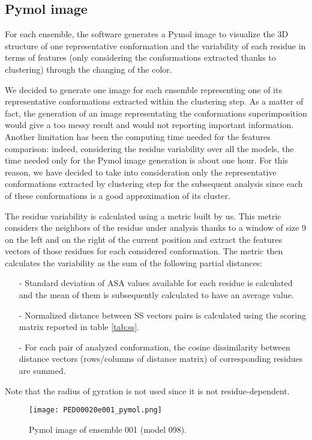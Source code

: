 \subsection{Pymol image}
For each ensemble, the software generates a Pymol image to visualize the 3D structure of one representative conformation and the variability of each residue in terms of features (only considering the conformations extracted thanks to clustering) through the changing of the color. %

We decided to generate one image for each ensemble representing one of its representative conformations extracted within the clustering step.
As a matter of fact, the generation of an image representating the conformations superimposition would give a too messy result and would not reporting important information. 
Another limitation has been the computing time needed for the features comparison: indeed, considering the residue variability over all the models, the time needed only for the Pymol image generation is about one hour. For this reason, we have decided to take into consideration only the representative conformations extracted by clustering step for the subsequent analysis since each of these conformations is a good approximation of its cluster.

\medskip
The residue variability is calculated using a metric built by us. 
This metric considers the neighbors of the residue under analysis thanks to a window of size 9 on the left and on the right of the current position and extract the features vectors of those residues for each considered conformation. 
The metric then calculates the variability as the sum of the following partial distances:
\begin{itemize}
\item[-] Standard deviation of ASA values available for each residue is calculated and the mean of them is subsequently calculated to have an average value.
\item[-] Normalized distance between SS vectors pairs is calculated using the scoring matrix reported in table \ref{tab:ss}.
\item[-] For each pair of analyzed conformation, the cosine dissimilarity between distance vectors (rows/columns of distance matrix) of corresponding residues are summed.
\end{itemize}
Note that the radius of gyration is not used since it is not residue-dependent.

\begin{figure}[H]
    \centering
		\texttt{[image: PED00020e001\_pymol.png]}
		\caption{Pymol image of ensemble 001 (model 098).}
		\label{model001p}
\end{figure}

